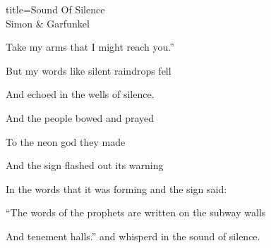 \begin{song}{title=\centering Sound Of Silence \\\normalsize Simon \& Garfunkel  \vspace*{-0.3cm}}
{   Take my arms that I might reach you.''
   
   But my words like silent raindrops fell 
   
   And echoed in the wells of silence. 
   
\sloka
   And the people bowed and prayed 
   
   To the neon god they made 
   
   And the sign flashed out its warning 
   
   In the words that it was forming and the sign said: 
   
   ``The words of the prophets are written on the subway walls 
   
    And tenement halls.'' and whisper\ap d in the sound of silence. 
   

}
\setcounter{Slokočet}{0}
\end{song}
